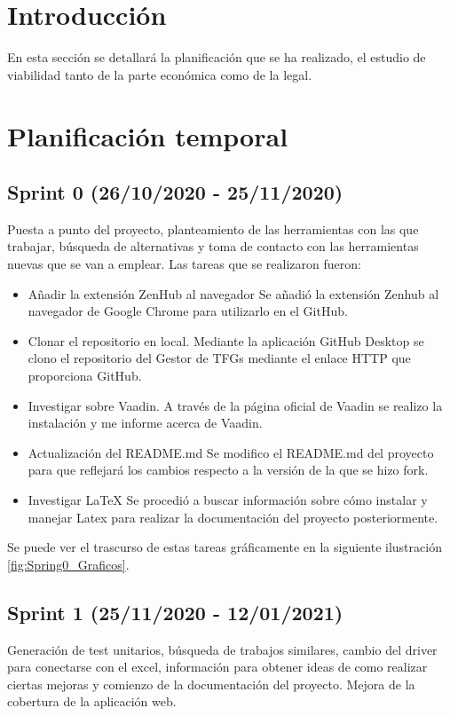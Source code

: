 
\section{Introducción}
En esta sección se detallará la planificación que se ha realizado, el estudio de viabilidad tanto de la parte económica como de la legal.

\section{Planificación temporal}
\subsection{Sprint 0 (26/10/2020 - 25/11/2020)}
Puesta a punto del proyecto, planteamiento de las herramientas con las que trabajar, búsqueda de alternativas y toma de contacto con las herramientas nuevas que se van a emplear.
Las tareas que se realizaron fueron:
\begin{itemize}
	\tightlist
	\item Añadir la extensión ZenHub al navegador
		Se añadió la extensión Zenhub al navegador de Google Chrome para utilizarlo en el GitHub.
	\item Clonar el repositorio en local. 
		Mediante la aplicación GitHub Desktop se clono el repositorio del Gestor de TFGs mediante el enlace HTTP que proporciona GitHub.
	\item Investigar sobre Vaadin.
		A través de la página oficial de Vaadin se realizo la instalación y me informe acerca de Vaadin.
	\item Actualización del README.md 
		Se modifico el README.md del proyecto para que reflejará los cambios respecto a la versión de la que se hizo fork. 
	\item Investigar LaTeX
		Se procedió a buscar información sobre cómo instalar y manejar Latex para realizar la documentación del proyecto posteriormente.
\end{itemize}

Se puede ver el trascurso de estas tareas gráficamente en la siguiente ilustración \ref{fig:Spring0_Graficos}.



\subsection{Sprint 1 (25/11/2020 - 12/01/2021)}
Generación de test unitarios, búsqueda de trabajos similares, cambio del driver para conectarse con el excel, información para obtener ideas de como realizar ciertas mejoras y comienzo de la documentación del proyecto. Mejora de la cobertura de la aplicación web.

